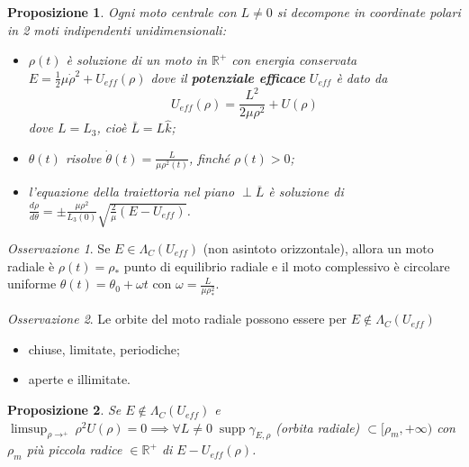 \documentclass{book}
\theoremstyle{plain}
\theoremstyle{plain}
\theoremstyle{plain}
\theoremstyle{plain}
\theoremstyle{plain}
\newtheorem{prop}{Proposizione}[chapter]
\theoremstyle{definition}
\theoremstyle{remark}
\newtheorem*{oss}{Osservazione}
\theoremstyle{definition}
\begin{document}
\begin{prop}
\everymath{\displaystyle}
    Ogni moto centrale con $L\neq0$ si decompone in coordinate polari in 2 moti indipendenti unidimensionali:
    \begin{itemize}
        \item $\rho(t)$ è soluzione di un moto in $\mathbb{R}^+$ con energia conservata $E=\frac{1}{2}\mu\Dot{\rho}^2 +U_{eff}(\rho)$ dove il \textbf{potenziale efficace} $U_{eff}$ è dato da
        \begin{displaymath}
             U_{eff}(\rho)=\frac{L^2}{2\mu\rho^2}+U(\rho)
        \end{displaymath}
        dove $L=L_3$, cioè $\overline{L}=L\hat{k}$;
        \item $\theta(t)$ risolve $\Dot{\theta}(t)=\frac{L}{\mu\rho^2(t)}$, finché $\rho(t)>0$;
        \item l'equazione della traiettoria nel piano $\perp \overline{L}$ è soluzione di $\frac{d\rho}{d\theta}=\pm \frac{\mu\rho^2}{L_3(0)}\sqrt{\frac{2}{\mu}(E-U_{eff})}$.
    \end{itemize}
\end{prop}

\begin{oss}
    Se $E\in\Lambda_C(U_{eff})$ (non asintoto orizzontale), allora un moto radiale è $\rho(t)=\rho_*$ punto di equilibrio radiale e il moto complessivo è circolare uniforme $\theta(t)=\theta_0+\omega t$ con $\omega=\frac{L}{\mu\rho_*^2}$.
\end{oss}

\begin{oss}
    Le orbite del moto radiale possono essere per $E\notin\Lambda_C(U_{eff})$
    \begin{itemize}
        \item chiuse, limitate, periodiche;
        \item aperte e illimitate.
    \end{itemize}
\end{oss}

\begin{prop}
    Se $E\notin\Lambda_C(U_{eff})$ e $\limsup_{\rho\to^+}\rho^2U(\rho)=0 \implies \forall L \neq 0 \;\operatorname{supp}\gamma_{E, \rho}$ (orbita radiale) $\subset [\rho_m,+\infty)$ con $\rho_m$ più piccola radice $\in \mathbb{R}^+$ di $E-U_{eff}(\rho)$.
\end{prop}
\end{document}

